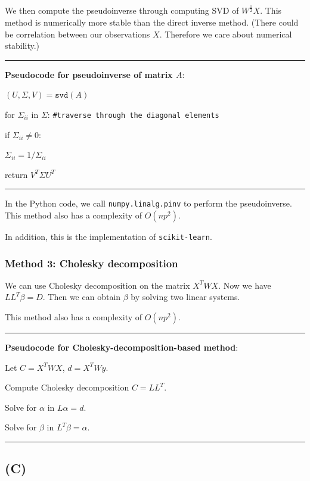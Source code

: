 \documentclass[a4paper,11pt]{article}
\begin{document}
We then compute the pseudoinverse through computing SVD of ${W}^{\frac{1}{2}}X$. This method is numerically more stable than the direct inverse method. (There could be correlation between our observations $X$. Therefore we care about numerical stability.)

\newpage 
\noindent\rule{\textwidth}{1pt}
\textbf{Pseudocode for pseudoinverse of matrix $A$}:
\begin{adjustwidth}{1cm}{1cm}
{\parindent0pt
$(U,\Sigma,V) =\texttt{svd}(A)$

for $\Sigma_{ii}$ in $\Sigma$: \texttt{\#traverse through the diagonal elements}

\quad if $\Sigma_{ii} \neq 0$:
	
\quad \quad $\Sigma_{ii} = 1/\Sigma_{ii}$
		
return $V^T  \Sigma  U^T$}
\end{adjustwidth}	

\noindent\rule{\textwidth}{1pt}


In the Python code, we call \texttt{numpy.linalg.pinv} to perform the pseudoinverse. This method also has a complexity of $O(np^2)$.

In addition, this is the implementation of \texttt{scikit-learn}.



\subsubsection{Method 3: Cholesky decomposition}

We can use Cholesky decomposition on the matrix $X^TWX$. Now we have $LL^T \beta  = D$. Then we can obtain $\beta$ by solving two linear systems.

This method also has a complexity of $O(np^2)$.

\noindent\rule{\textwidth}{1pt}
\textbf{Pseudocode for Cholesky-decomposition-based method}:
\begin{adjustwidth}{1cm}{1cm}
{\parindent0pt
Let $C = X^TWX$, $d=X^TWy$. 

Compute Cholesky decomposition $C = LL^T$.

Solve for $\alpha$ in $L\alpha=d$.

Solve for $\beta$ in $L^T {\beta}=\alpha$.
}
\end{adjustwidth}	
\noindent\rule{\textwidth}{1pt}

\subsection{(C)}
\end{document}
